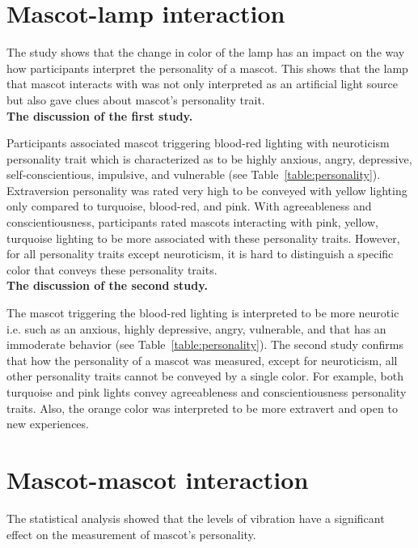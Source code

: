 \section{Mascot-lamp interaction}
\label{sec:mascot-lamp-interaction}
The study shows that the change in color of the lamp has an impact on the way
how participants interpret the personality of a mascot.
This shows that the lamp that mascot interacts with was not only interpreted as an
artificial light source but also gave clues about mascot's personality trait.\\

\textbf{The discussion of the first study.}\par
Participants associated mascot triggering blood-red lighting with neuroticism personality trait
which is characterized as to be highly anxious, angry, depressive, self-conscientious, impulsive, and vulnerable (see Table~\ref{table:personality}).
Extraversion personality was rated very high to be conveyed with yellow lighting only compared
to turquoise, blood-red, and pink.
With agreeableness and conscientiousness, participants rated mascots interacting with pink, yellow,
turquoise lighting to be more associated with these personality traits.
However, for all personality traits except neuroticism, it is hard to distinguish
a specific color that conveys these personality traits.\\

\textbf{The discussion of the second study.}\par
The mascot triggering the blood-red lighting is interpreted to be more neurotic i.e. such as an anxious, highly depressive,
angry, vulnerable, and that has an immoderate behavior (see Table~\ref{table:personality}).
The second study confirms that how the personality of a mascot was measured, except
for neuroticism, all other personality traits cannot be conveyed by a single color.
For example, both turquoise and pink lights convey agreeableness and
conscientiousness personality traits.
Also, the orange color was interpreted to be more extravert and open to new experiences.\\


\section{Mascot-mascot interaction}
\label{sec:mascot-mascot-interaction}
The statistical analysis showed that the levels of vibration have a significant effect on the
measurement of mascot's personality.\\

